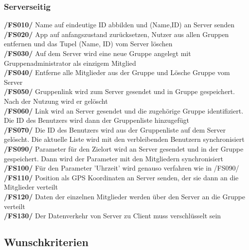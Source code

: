 \subsubsection{Serverseitig}
     \textbf{/FS010/} Name auf eindeutige ID abbilden und (Name,ID) an Server senden\\
     \textbf{/FS020/} App auf anfangszustand zurücksetzen, Nutzer aus allen Gruppen entfernen und das Tupel (Name, ID) vom Server löschen \\
     \textbf{/FS030/} Auf dem Server wird eine neue Gruppe angelegt mit Gruppenadministrator als einzigem Mitglied\\
     \textbf{/FS040/} Entferne alle Mitglieder aus der Gruppe und Lösche Gruppe vom Server\\
     \textbf{/FS050/} Gruppenlink wird zum Server gesendet und in Gruppe gespeichert. Nach der Nutzung wird er gelöscht\\
     \textbf{/FS060/} Link wird an Server gesendet und die zugehörige Gruppe identifiziert.\\ Die ID des Benutzers wird dann der Gruppenliste hinzugefügt\\
     \textbf{/FS070/} Die ID des Benutzers wird aus der Gruppenliste auf dem Server gelöscht. Die aktuelle Liste wird mit den verbleibenden Benutzern synchronisiert\\
     \textbf{/FS090/} Parameter für den Zielort wird an Server gesendet und in der Gruppe gespeichert. Dann wird der Parameter mit den Mitgliedern synchronisiert \\
     \textbf{/FS100/} Für den Parameter 'Uhrzeit' wird genauso verfahren wie in /FS090/ \\
     \textbf{/FS110/} Position als GPS Koordinaten an Server senden, der sie dann an die Mitglieder verteilt\\
     \textbf{/FS120/} Daten der einzelnen Mitglieder werden über den Server an die Gruppe verteilt \\
     \textbf{/FS130/} Der Datenverkehr von Server zu Client muss verschlüsselt sein\\
\subsection{Wunschkriterien}
